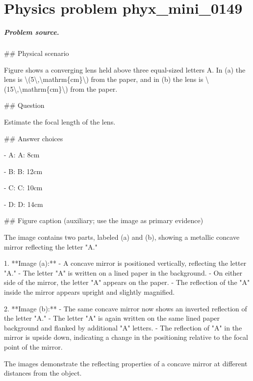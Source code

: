 
\chapter{Physics problem phyx\_mini\_0149}
\label{ch:PhyXMiniProblems_problem_phyx_mini_0149}

\paragraph{Problem source.}
\#\# Physical scenario

Figure shows a converging lens held above three equal-sized letters A. In (a) the lens is \textbackslash{}(5\textbackslash{},\textbackslash{}mathrm\{cm\}\textbackslash{}) from the paper, and in (b) the lens is \textbackslash{}(15\textbackslash{},\textbackslash{}mathrm\{cm\}\textbackslash{}) from the paper.

\#\# Question

Estimate the focal length of the lens.

\#\# Answer choices

- A: A: 8cm

- B: B: 12cm

- C: C: 10cm

- D: D: 14cm

\#\# Figure caption (auxiliary; use the image as primary evidence)

The image contains two parts, labeled (a) and (b), showing a metallic concave mirror reflecting the letter "A."

1. **Image (a):**
   - A concave mirror is positioned vertically, reflecting the letter "A."
   - The letter "A" is written on a lined paper in the background.
   - On either side of the mirror, the letter "A" appears on the paper.
   - The reflection of the "A" inside the mirror appears upright and slightly magnified.

2. **Image (b):**
   - The same concave mirror now shows an inverted reflection of the letter "A."
   - The letter "A" is again written on the same lined paper background and flanked by additional "A" letters.
   - The reflection of "A" in the mirror is upside down, indicating a change in the positioning relative to the focal point of the mirror.

The images demonstrate the reflecting properties of a concave mirror at different distances from the object.

